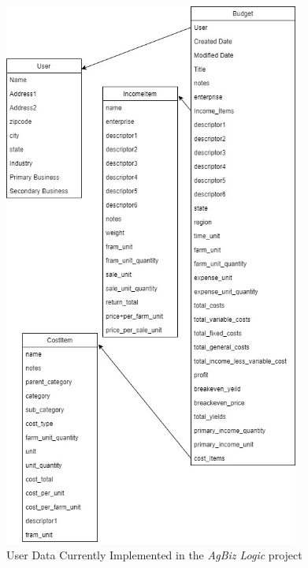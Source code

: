 \documentclass[onecolumn, draftclsnofoot,10pt, compsoc]{article}
\begin{document}
		\begin{figure}[htb]
			\begin{center}
				\includegraphics[width=275pt]{UMLDiagrams/UserData.jpg}
			\end{center}
			\caption{User Data Currently Implemented in the \textit{AgBiz Logic} project}
			\label{fig:UD1}
		\end{figure}
		\clearpage
\end{document}
